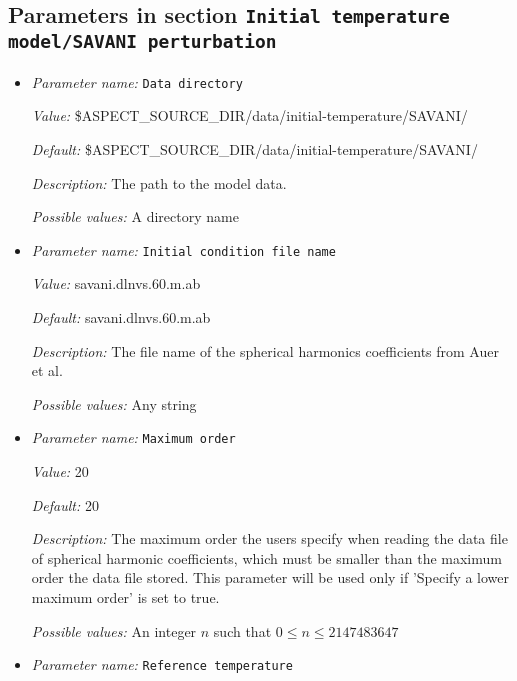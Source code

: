 \subsection{Parameters in section \tt Initial temperature model/SAVANI perturbation}
\label{parameters:Initial_20temperature_20model/SAVANI_20perturbation}

\begin{itemize}
\item {\it Parameter name:} {\tt Data directory}
\label{parameters:Initial temperature model/SAVANI perturbation/Data directory}


{\it Value:} \$ASPECT\_SOURCE\_DIR/data/initial-temperature/SAVANI/


{\it Default:} \$ASPECT\_SOURCE\_DIR/data/initial-temperature/SAVANI/


{\it Description:} The path to the model data.


{\it Possible values:} A directory name
\item {\it Parameter name:} {\tt Initial condition file name}
\label{parameters:Initial temperature model/SAVANI perturbation/Initial condition file name}


{\it Value:} savani.dlnvs.60.m.ab


{\it Default:} savani.dlnvs.60.m.ab


{\it Description:} The file name of the spherical harmonics coefficients from Auer et al.


{\it Possible values:} Any string
\item {\it Parameter name:} {\tt Maximum order}
\label{parameters:Initial temperature model/SAVANI perturbation/Maximum order}


{\it Value:} 20


{\it Default:} 20


{\it Description:} The maximum order the users specify when reading the data file of spherical harmonic coefficients, which must be smaller than the maximum order the data file stored. This parameter will be used only if 'Specify a lower maximum order' is set to true.


{\it Possible values:} An integer $n$ such that $0\leq n \leq 2147483647$
\item {\it Parameter name:} {\tt Reference temperature}
\label{parameters:Initial temperature model/SAVANI perturbation/Reference temperature}



\end{itemize}
